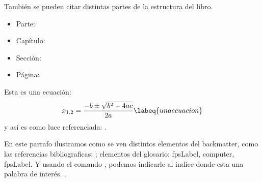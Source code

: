 También se pueden citar distintas partes de la estructura del libro.
\begin{itemize}
    \item Parte: 
    \item Capítulo: 
    \item Sección: 
    \item Página: 
\end{itemize}

Esta es una ecuación:
\begin{equation}
    x_{1,2}=\frac{-b\pm\sqrt{b^2-4ac}}{2a}
    \labeq{unaecuacion}
\end{equation}
y así es como luce referenciada: .

En este parrafo ilustramos como se ven distintos elementos del backmatter, como las referencias bibliograficas: ; elementos del glosario: \acrfull{fpsLabel}, \gls{computer}, \acrshort{fpsLabel}. Y usando el comando , podemos indicarle al indice donde esta una palabra de interés. .




